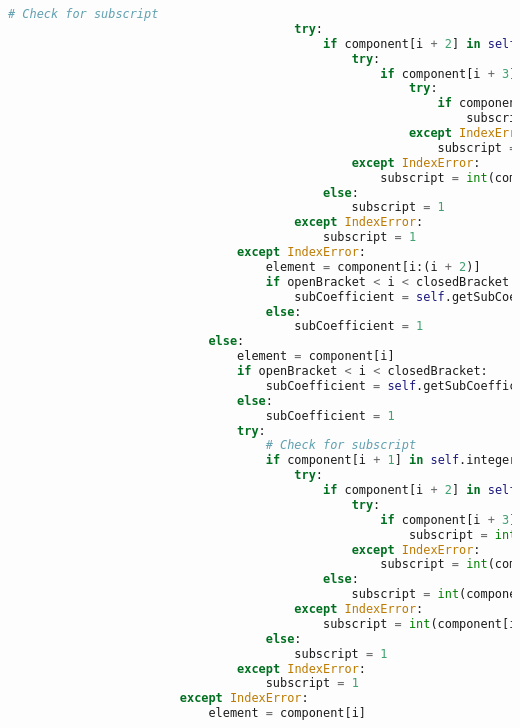 \documentclass[a4paper,12pt]{article}
\begin{document}
\begin{lstlisting}[language=Python, caption=parseComponent method for finding elements]
                                        # Check for subscript
                                        try:
                                            if component[i + 2] in self.integers:
                                                try:
                                                    if component[i + 3] in self.integers:
                                                        try:
                                                            if component[i + 4] in self.integers:
                                                                subscript = int(component[(i + 2): (i + 5)])
                                                        except IndexError:
                                                            subscript = int(component[(i + 2): (i + 4)])
                                                except IndexError:
                                                    subscript = int(component[i + 2])
                                            else:
                                                subscript = 1
                                        except IndexError:
                                            subscript = 1
                                except IndexError:
                                    element = component[i:(i + 2)]
                                    if openBracket < i < closedBracket:
                                        subCoefficient = self.getSubCoefficient(component)
                                    else:
                                        subCoefficient = 1
                            else:
                                element = component[i]
                                if openBracket < i < closedBracket:
                                    subCoefficient = self.getSubCoefficient(component)
                                else:
                                    subCoefficient = 1
                                try:
                                    # Check for subscript
                                    if component[i + 1] in self.integers:
                                        try:
                                            if component[i + 2] in self.integers:
                                                try:
                                                    if component[i + 3] in self.integers:
                                                        subscript = int(component[i + 1: i + 4])
                                                except IndexError:
                                                    subscript = int(component[i + 1: i + 3])
                                            else:
                                                subscript = int(component[i + 1])
                                        except IndexError:
                                            subscript = int(component[i + 1])
                                    else:
                                        subscript = 1
                                except IndexError:
                                    subscript = 1
                        except IndexError:
                            element = component[i]


\end{lstlisting}
\end{document}
